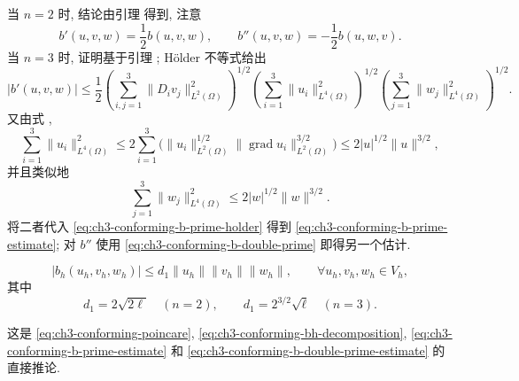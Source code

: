 \begin{Proof}
当 $n=2$ 时, 结论由引理  得到, 注意
\[
b'(u,v,w)=\frac12b(u,v,w),\qquad
b''(u,v,w)=-\frac12b(u,w,v).
\]
当 $n=3$ 时, 证明基于引理 ; H\"older 不等式给出
\begin{equation}
|b'(u,v,w)|\leq\frac12
\left(\sum_{i,j=1}^3\lVert D_iv_j\rVert_{L^2(\Omega)}^2\right)^{1/2}
\left(\sum_{i=1}^3\lVert u_i\rVert_{L^4(\Omega)}^2\right)^{1/2}
\left(\sum_{j=1}^3\lVert w_j\rVert_{L^4(\Omega)}^2\right)^{1/2}.
\label{eq:ch3-conforming-b-prime-holder}
\end{equation}
又由式 ,
\begin{equation}
\sum_{i=1}^3\lVert u_i\rVert_{L^4(\Omega)}^2
\leq2\sum_{i=1}^3\bigl(\lVert u_i\rVert_{L^2(\Omega)}^{1/2}
\lVert\operatorname{grad}u_i\rVert_{L^2(\Omega)}^{3/2}\bigr)
\leq2|u|^{1/2}\lVert u\rVert^{3/2},
\label{eq:ch3-conforming-l4-u}
\end{equation}
并且类似地
\begin{equation}
\sum_{j=1}^3\lVert w_j\rVert_{L^4(\Omega)}^2
\leq2|w|^{1/2}\lVert w\rVert^{3/2}.
\label{eq:ch3-conforming-l4-w}
\end{equation}
将二者代入 \eqref{eq:ch3-conforming-b-prime-holder} 得到 \eqref{eq:ch3-conforming-b-prime-estimate}; 对 $b''$ 使用 \eqref{eq:ch3-conforming-b-double-prime} 即得另一个估计.
\end{Proof}

\hypertarget{chapter-03-page-271}{}
\begin{Lemma}
\label{lem:ch3-conforming-trilinear-continuity}
\begin{equation}
|b_h(u_h,v_h,w_h)|\leq d_1\lVert u_h\rVert\lVert v_h\rVert\lVert w_h\rVert,
\qquad\forall u_h,v_h,w_h\in V_h,
\label{eq:ch3-conforming-bh-continuity}
\end{equation}
其中
\begin{equation}
d_1=2\sqrt{2\ell}\quad(n=2),
\qquad d_1=2^{3/2}\sqrt\ell\quad(n=3).
\label{eq:ch3-conforming-bh-continuity-constant}
\end{equation}
\end{Lemma}

\begin{Proof}
这是 \eqref{eq:ch3-conforming-poincare}, \eqref{eq:ch3-conforming-bh-decomposition}, \eqref{eq:ch3-conforming-b-prime-estimate} 和 \eqref{eq:ch3-conforming-b-double-prime-estimate} 的直接推论.
\end{Proof}


